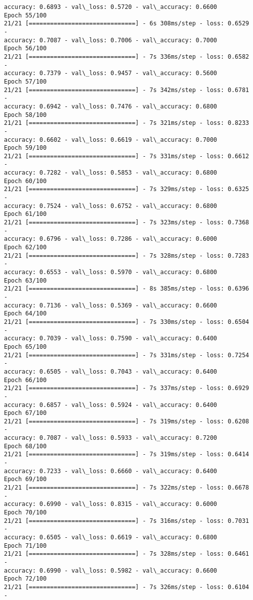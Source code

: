 \documentclass[11pt]{article}
\begin{document}
\begin{Verbatim}[commandchars=\\\{\}]
accuracy: 0.6893 - val\_loss: 0.5720 - val\_accuracy: 0.6600
Epoch 55/100
21/21 [==============================] - 6s 308ms/step - loss: 0.6529 -
accuracy: 0.7087 - val\_loss: 0.7006 - val\_accuracy: 0.7000
Epoch 56/100
21/21 [==============================] - 7s 336ms/step - loss: 0.6582 -
accuracy: 0.7379 - val\_loss: 0.9457 - val\_accuracy: 0.5600
Epoch 57/100
21/21 [==============================] - 7s 342ms/step - loss: 0.6781 -
accuracy: 0.6942 - val\_loss: 0.7476 - val\_accuracy: 0.6800
Epoch 58/100
21/21 [==============================] - 7s 321ms/step - loss: 0.8233 -
accuracy: 0.6602 - val\_loss: 0.6619 - val\_accuracy: 0.7000
Epoch 59/100
21/21 [==============================] - 7s 331ms/step - loss: 0.6612 -
accuracy: 0.7282 - val\_loss: 0.5853 - val\_accuracy: 0.6800
Epoch 60/100
21/21 [==============================] - 7s 329ms/step - loss: 0.6325 -
accuracy: 0.7524 - val\_loss: 0.6752 - val\_accuracy: 0.6800
Epoch 61/100
21/21 [==============================] - 7s 323ms/step - loss: 0.7368 -
accuracy: 0.6796 - val\_loss: 0.7286 - val\_accuracy: 0.6000
Epoch 62/100
21/21 [==============================] - 7s 328ms/step - loss: 0.7283 -
accuracy: 0.6553 - val\_loss: 0.5970 - val\_accuracy: 0.6800
Epoch 63/100
21/21 [==============================] - 8s 385ms/step - loss: 0.6396 -
accuracy: 0.7136 - val\_loss: 0.5369 - val\_accuracy: 0.6600
Epoch 64/100
21/21 [==============================] - 7s 330ms/step - loss: 0.6504 -
accuracy: 0.7039 - val\_loss: 0.7590 - val\_accuracy: 0.6400
Epoch 65/100
21/21 [==============================] - 7s 331ms/step - loss: 0.7254 -
accuracy: 0.6505 - val\_loss: 0.7043 - val\_accuracy: 0.6400
Epoch 66/100
21/21 [==============================] - 7s 337ms/step - loss: 0.6929 -
accuracy: 0.6857 - val\_loss: 0.5924 - val\_accuracy: 0.6400
Epoch 67/100
21/21 [==============================] - 7s 319ms/step - loss: 0.6208 -
accuracy: 0.7087 - val\_loss: 0.5933 - val\_accuracy: 0.7200
Epoch 68/100
21/21 [==============================] - 7s 319ms/step - loss: 0.6414 -
accuracy: 0.7233 - val\_loss: 0.6660 - val\_accuracy: 0.6400
Epoch 69/100
21/21 [==============================] - 7s 322ms/step - loss: 0.6678 -
accuracy: 0.6990 - val\_loss: 0.8315 - val\_accuracy: 0.6000
Epoch 70/100
21/21 [==============================] - 7s 316ms/step - loss: 0.7031 -
accuracy: 0.6505 - val\_loss: 0.6619 - val\_accuracy: 0.6800
Epoch 71/100
21/21 [==============================] - 7s 328ms/step - loss: 0.6461 -
accuracy: 0.6990 - val\_loss: 0.5982 - val\_accuracy: 0.6600
Epoch 72/100
21/21 [==============================] - 7s 326ms/step - loss: 0.6104 -

\end{Verbatim}
\end{document}
